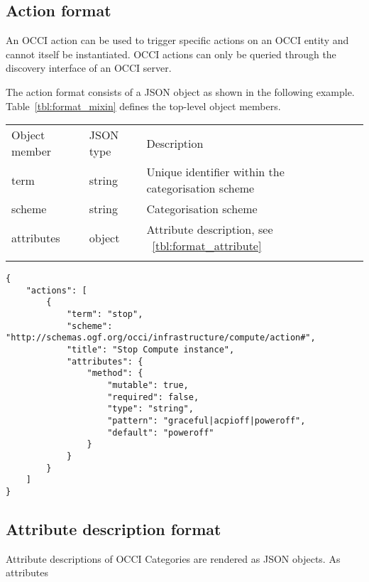 \documentclass[10pt,a4paper]{article}
\begin{document}
\subsection{Action format}

An OCCI action can be used to trigger specific actions on an OCCI entity and cannot itself be 
instantiated. OCCI actions can only be queried through the discovery interface 
of an OCCI server.

The action format consists of a JSON object as shown in the
following example.
Table~\ref{tbl:format_mixin} defines the top-level object members.

 {
    \begin{tabular}{llll}
    \toprule
    Object member & JSON type & Description \\
    \colrule
    term & string & Unique identifier within the categorisation scheme \\
    scheme & string & Categorisation scheme \\
    attributes & object & Attribute description, see ~\ref{tbl:format_attribute} \\
    \botrule
    \end{tabular}
}

\begin{verbatim}
{
    "actions": [
        {
            "term": "stop",
            "scheme": "http://schemas.ogf.org/occi/infrastructure/compute/action#",
            "title": "Stop Compute instance",
            "attributes": {
                "method": {
                    "mutable": true,
                    "required": false,
                    "type": "string",
                    "pattern": "graceful|acpioff|poweroff",
                    "default": "poweroff"
                }
            }
        }
	]
}
\end{verbatim}

\subsection{Attribute description format}

Attribute descriptions of OCCI Categories are rendered as JSON objects. As attributes
\end{document}
